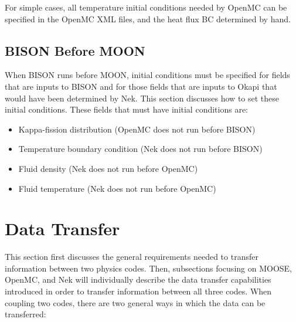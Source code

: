 \documentclass[10pt]{article}
\numberwithin{equation}{section} %
\begin{document}
For simple cases, all temperature initial conditions needed by OpenMC can be specified in the OpenMC XML files, and the heat flux BC determined by hand. 

\subsection{BISON Before MOON}
When BISON runs before MOON, initial conditions must be specified for fields that are inputs to BISON and for those fields that are inputs to Okapi that would have been determined by Nek. This section discusses how to set these initial conditions. These fields that must have initial conditions are:

\begin{itemize}
\item Kappa-fission distribution (OpenMC does not run before BISON)
\item Temperature boundary condition (Nek does not run before BISON)
\item Fluid density (Nek does not run before OpenMC)
\item Fluid temperature (Nek does not run before OpenMC)
\end{itemize}

\clearpage
\section{Data Transfer}
This section first discusses the general requirements needed to transfer information between two physics codes. Then, subsections focusing on MOOSE, OpenMC, and Nek will individually describe the data transfer capabilities introduced in order to transfer information between all three codes. When coupling two codes, there are two general ways in which the data can be transferred:
\end{document}
